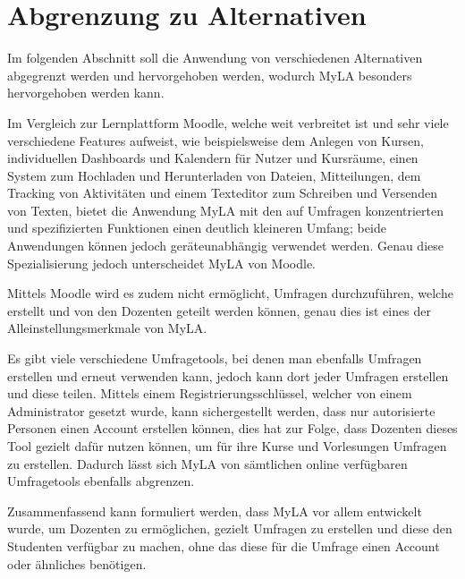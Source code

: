 \section{Abgrenzung zu Alternativen}
\label{sec:AbgrenzungZuAlternativen}

Im folgenden Abschnitt soll die Anwendung von verschiedenen Alternativen abgegrenzt werden und hervorgehoben werden, wodurch MyLA besonders hervorgehoben werden kann.

Im Vergleich zur Lernplattform Moodle, welche weit verbreitet ist und sehr viele verschiedene Features aufweist, wie beispielsweise dem Anlegen von Kursen, individuellen Dashboards und Kalendern für Nutzer und Kursräume, einen System zum Hochladen und Herunterladen von Dateien, Mitteilungen, dem Tracking von Aktivitäten und einem Texteditor zum Schreiben und Versenden von Texten, bietet die Anwendung MyLA mit den auf Umfragen konzentrierten und spezifizierten Funktionen einen deutlich kleineren Umfang; beide Anwendungen können jedoch geräteunabhängig verwendet werden\autocite[Vgl.][]{jr-moodle-features}.
Genau diese Spezialisierung jedoch unterscheidet MyLA von Moodle.

Mittels Moodle wird es zudem nicht ermöglicht, Umfragen durchzuführen, welche erstellt und von den Dozenten geteilt werden können, genau dies ist eines der Alleinstellungsmerkmale von MyLA.

Es gibt viele verschiedene Umfragetools, bei denen man ebenfalls Umfragen erstellen und erneut verwenden kann, jedoch kann dort jeder Umfragen erstellen und diese teilen.
Mittels einem Registrierungsschlüssel, welcher von einem Administrator gesetzt wurde, kann sichergestellt werden, dass nur autorisierte Personen einen Account erstellen können, dies hat zur Folge, dass Dozenten dieses Tool gezielt dafür nutzen können, um für ihre Kurse und Vorlesungen Umfragen zu erstellen.
Dadurch lässt sich MyLA von sämtlichen online verfügbaren Umfragetools ebenfalls abgrenzen. 

Zusammenfassend kann formuliert werden, dass MyLA vor allem entwickelt wurde, um Dozenten zu ermöglichen, gezielt Umfragen zu erstellen und diese den Studenten verfügbar zu machen, ohne das diese für die Umfrage einen Account oder ähnliches benötigen.
